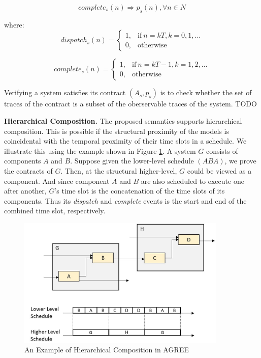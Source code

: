 \begin{equation} 
\label{eqn:sys_assumption}
complete_s(n) \Rightarrow p_s(n), \forall n\in N
\end{equation}

where:
\begin{equation}
\label{eqn:sys_dispatch}
    dispatch_s(n) =
    \begin{cases}
      1, & \text{if}\ n = kT, k=0,1,... \\
      0, & \text{otherwise}
    \end{cases}
\end{equation}

\begin{equation}
\label{eqn:sys_complete}
    complete_s(n) =
    \begin{cases}
      1, & \text{if}\ n = kT-1, k=1,2,... \\
      0, & \text{otherwise}
    \end{cases}
\end{equation}

Verifying a system satisfies its contract $(A_s, p_s)$ is to check whether the set of traces of the contract is a subset of the oberservable traces of the system. TODO

{\bf Hierarchical Composition.}
The proposed semantics supports hierarchical composition. This is possible if the structural proximity of the models is coincidental with the temporal proximity of their time slots in a schedule. We illustrate this using the example shown in Figure \ref{pic:hierarchy}. A system $G$ consists of components $A$ and $B$. Suppose given the lower-level schedule $(ABA)$, we prove the contracts of $G$. Then, at the structural higher-level, $G$ could be viewed as a component. And since component $A$ and $B$ are also scheduled to execute one after another, $G$'s time slot is the concatenation of the time slots of its components. Thus its \emph{dispatch} and \emph{complete} events is the start and end of the combined time slot, respectively.

\begin{figure}[ht!]
\centering
\includegraphics[width=100mm]{Hierarchy.jpg}
\caption{An Example of Hierarchical Composition in AGREE\label{pic:hierarchy}}
\end{figure}

